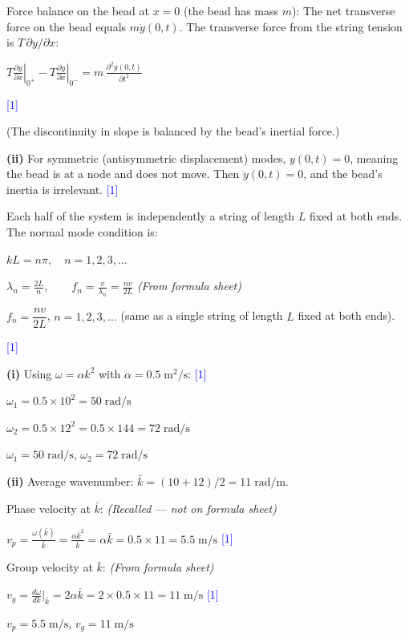 \documentclass[12pt,a4paper]{article}
\newcommand{\markstep}[1]{\hfill\textcolor{blue}{[#1]}}
\newcommand{\finalanswer}[1]{%
  \begin{tcolorbox}[colback=green!5!white,colframe=green!50!black,boxrule=0.5pt]
  #1
  \end{tcolorbox}
}
\newcommand{\fromsheet}{\textit{(From formula sheet)}}
\newcommand{\recalled}{\textit{(Recalled --- not on formula sheet)}}
\begin{document}
\begin{parts}
Force balance on the bead at $x = 0$ (the bead has mass $m$): The net transverse force on the bead equals $m\ddot{y}(0,t)$. The transverse force from the string tension is $T\,\partial y/\partial x$:

\finalanswer{$T\left.\frac{\partial y}{\partial x}\right|_{0^+} - T\left.\frac{\partial y}{\partial x}\right|_{0^-} = m\,\frac{\partial^2 y(0,t)}{\partial t^2}$} \markstep{1}

(The discontinuity in slope is balanced by the bead's inertial force.)

\textbf{(ii)} For symmetric (antisymmetric displacement) modes, $y(0,t) = 0$, meaning the bead is at a node and does not move. Then $\ddot{y}(0,t) = 0$, and the bead's inertia is irrelevant. \markstep{1}

Each half of the system is independently a string of length $L$ fixed at both ends. The normal mode condition is:

$kL = n\pi, \quad n = 1, 2, 3, \ldots$

$\lambda_n = \frac{2L}{n}, \qquad f_n = \frac{v}{\lambda_n} = \frac{nv}{2L}$ \fromsheet

\finalanswer{$f_n = \dfrac{nv}{2L}$, \quad $n = 1, 2, 3, \ldots$ (same as a single string of length $L$ fixed at both ends).} \markstep{1}

\item

\textbf{(i)} Using $\omega = \alpha k^2$ with $\alpha = 0.5\;\text{m}^2/\text{s}$: \markstep{1}

$\omega_1 = 0.5\times 10^2 = 50\;\text{rad/s}$

$\omega_2 = 0.5\times 12^2 = 0.5\times 144 = 72\;\text{rad/s}$

\finalanswer{$\omega_1 = 50\;\text{rad/s}$, \quad $\omega_2 = 72\;\text{rad/s}$}

\textbf{(ii)} Average wavenumber: $\bar{k} = (10+12)/2 = 11\;\text{rad/m}$.

Phase velocity at $\bar{k}$: \recalled

$v_p = \frac{\omega(\bar{k})}{\bar{k}} = \frac{\alpha\bar{k}^2}{\bar{k}} = \alpha\bar{k} = 0.5\times 11 = 5.5\;\text{m/s}$ \markstep{1}

Group velocity at $\bar{k}$: \fromsheet

$v_g = \frac{d\omega}{dk}\bigg|_{\bar{k}} = 2\alpha\bar{k} = 2\times 0.5\times 11 = 11\;\text{m/s}$ \markstep{1}

\finalanswer{$v_p = 5.5\;\text{m/s}$, \quad $v_g = 11\;\text{m/s}$}


\end{parts}
\end{document}
